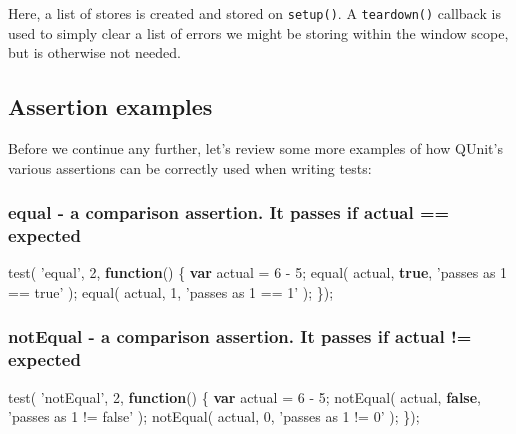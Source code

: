 \documentclass[9pt]{book}
\newenvironment{Shaded}{}{}
\newcommand{\KeywordTok}[1]{\textcolor[rgb]{0.00,0.44,0.13}{\textbf{{#1}}}}
\newcommand{\DecValTok}[1]{\textcolor[rgb]{0.25,0.63,0.44}{{#1}}}
\newcommand{\StringTok}[1]{\textcolor[rgb]{0.25,0.44,0.63}{{#1}}}
\newcommand{\FunctionTok}[1]{\textcolor[rgb]{0.02,0.16,0.49}{{#1}}}
\newcommand{\NormalTok}[1]{{#1}}
\begin{document}
Here, a list of stores is created and stored on \texttt{setup()}. A
\texttt{teardown()} callback is used to simply clear a list of errors we
might be storing within the window scope, but is otherwise not needed.

\subsection{Assertion examples}\label{assertion-examples}

Before we continue any further, let's review some more examples of how
QUnit's various assertions can be correctly used when writing tests:

\subsubsection{equal - a comparison assertion. It passes if actual ==
expected}\label{equal---a-comparison-assertion.-it-passes-if-actual-expected}

\begin{Shaded}
\begin{Highlighting}[]
\FunctionTok{test}\NormalTok{( }\StringTok{'equal'}\NormalTok{, }\DecValTok{2}\NormalTok{, }\KeywordTok{function}\NormalTok{() \{}
  \KeywordTok{var} \NormalTok{actual = }\DecValTok{6} \NormalTok{- }\DecValTok{5}\NormalTok{;}
  \FunctionTok{equal}\NormalTok{( actual, }\KeywordTok{true}\NormalTok{,  }\StringTok{'passes as 1 == true'} \NormalTok{);}
  \FunctionTok{equal}\NormalTok{( actual, }\DecValTok{1}\NormalTok{,     }\StringTok{'passes as 1 == 1'} \NormalTok{);}
\NormalTok{\});}
\end{Highlighting}
\end{Shaded}

\subsubsection{notEqual - a comparison assertion. It passes if actual !=
expected}\label{notequal---a-comparison-assertion.-it-passes-if-actual-expected}

\begin{Shaded}
\begin{Highlighting}[]
\FunctionTok{test}\NormalTok{( }\StringTok{'notEqual'}\NormalTok{, }\DecValTok{2}\NormalTok{, }\KeywordTok{function}\NormalTok{() \{}
  \KeywordTok{var} \NormalTok{actual = }\DecValTok{6} \NormalTok{- }\DecValTok{5}\NormalTok{;}
  \FunctionTok{notEqual}\NormalTok{( actual, }\KeywordTok{false}\NormalTok{, }\StringTok{'passes as 1 != false'} \NormalTok{);}
  \FunctionTok{notEqual}\NormalTok{( actual, }\DecValTok{0}\NormalTok{,     }\StringTok{'passes as 1 != 0'} \NormalTok{);}
\NormalTok{\});}
\end{Highlighting}
\end{Shaded}
\end{document}
